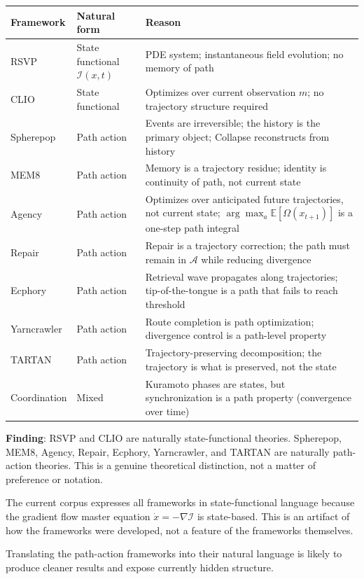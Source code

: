 \documentclass[11pt, a4paper]{article}
\begin{document}
\medskip
\begin{longtable}{p{3.5cm}lp{6.5cm}}
\toprule
\textbf{Framework} & \textbf{Natural form} & \textbf{Reason} \\
\midrule
RSVP & State functional $\mathcal{I}(x,t)$ & PDE system; instantaneous
  field evolution; no memory of path \\
CLIO & State functional & Optimizes over current observation $m$;
  no trajectory structure required \\
Spherepop & Path action & Events are irreversible; the history is the
  primary object; Collapse reconstructs from history \\
MEM\textbar{}8 & Path action & Memory is a trajectory residue;
  identity is continuity of path, not current state \\
Agency & Path action & Optimizes over anticipated future trajectories,
  not current state; $\arg\max_a \mathbb{E}[\Omega(x_{t+1})]$ is a
  one-step path integral \\
Repair & Path action & Repair is a trajectory correction; the
  path must remain in $\mathcal{A}$ while reducing divergence \\
Ecphory & Path action & Retrieval wave propagates along trajectories;
  tip-of-the-tongue is a path that fails to reach threshold \\
Yarncrawler & Path action & Route completion is path optimization;
  divergence control is a path-level property \\
TARTAN & Path action & Trajectory-preserving decomposition; the
  trajectory is what is preserved, not the state \\
Coordination & Mixed & Kuramoto phases are states, but synchronization
  is a path property (convergence over time) \\
\bottomrule
\end{longtable}

\medskip
\begin{notebox}
\textbf{Finding}: RSVP and CLIO are naturally state-functional theories.
Spherepop, MEM\textbar{}8, Agency, Repair, Ecphory, Yarncrawler, and
TARTAN are naturally path-action theories. This is a genuine theoretical
distinction, not a matter of preference or notation.

The current corpus expresses all frameworks in state-functional language
because the gradient flow master equation $\dot{x} = -\nabla\mathcal{I}$
is state-based. This is an artifact of how the frameworks were developed,
not a feature of the frameworks themselves.

Translating the path-action frameworks into their natural language is
likely to produce cleaner results and expose currently hidden structure.
\end{notebox}
\end{document}
